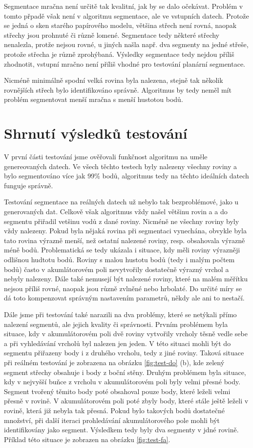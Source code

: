 \documentclass[11pt,twoside,a4paper]{book}
\begin{document}
Segmentace mračna není určitě tak kvalitní, jak by se dalo očekávat. Problém v tomto přpadě však není v algoritmu segmentace, ale ve vstupních datech. Protože se jedná o sken starého papírového modelu, většina střech není rovná, naopak střechy jsou prohnuté či různě lomené. Segmentace tedy některé střechy nenalezla, protže nejsou rovné, u jiných našla např. dva segmenty na jedné střeše, protože střecha je různě zprohýbaná. Výsledky segmentace tedy nejdou příliš zhodnotit, vstupní mračno není příliš vhodné pro testování planární segmentace.

Nicméně minimálně spodní velká rovina byla nalezena, stejně tak několik rovnějších střech bylo identifikováno správně. Algoritmus by tedy neměl mít problém segmentovat menší mračna s menší hustotou bodů.


\section{Shrnutí výsledků testování}

V první části testování jsme ověřovali funkčnost algoritmu na uměle genereovaných datech. Ve všech těchto testech byly nalezeny všechny roviny a bylo segmentováno více jak 99\% bodů, algoritmus tedy na těchto ideálních datech funguje správně.

Testování segmentace na reálných datech už nebylo tak bezproblémové, jako u generovaných dat. Celkově však algoritmus vždy našel většinu rovin a a do segmentu přiřadil vetšinu vodů z dané roviny. Nicméně ne všechny roviny byly vždy nalezeny. Pokud byla nějaká rovina při segmentaci vynechána, obvykle byla tato rovina výrazně menší, než ostatní nalezené roviny, resp. obsahovala výrazně méně bodů. Problematická se tedy ukázala i situace, kdy měli roviny výrazněji odlišnou hudtotu bodů. Roviny s malou hustotu bodů (tedy i malým počtem bodů) často v akumlátorovém poli nevytvořily dostatečně výrazný vrchol a nebyly nalezeny. Dále také nemusejí být nalezené roviny, které na malém měřítku nejsou příliš rovné, naopak jsou různě zvlněné nebo hrbolaté. Do určité míry se dá toto kompenzovat správným nastavením parametrů, někdy ale ani to nestačí. 

Dále jsme při testování také narazili na dva problémy, které se netýkali přímo nalezení segmentů, ale jejich kvality či správnosti. Prvním problémem byla situace, kdy v akumulátorovém poli dvě roviny vytvořily vrcholy těsně vedle sebe a při vyhledávání vrcholů byl nalezen jen jeden. V této situaci mohli být do segmentu přiřazeny body i z druhého vrcholu, tedy z jiné roviny. Taková situace při reálném testování je zobrazena na obrázku \ref{fig:test-do} (b), kde zelený segment střechy obsahuje i body z boční stěny. Druhým problémem byla situace, kdy v nejvyšší buňce z vrcholu v akumulátorovém poli byly velmi přesné body. Segment tvořený těmito body poté obsahoval pouze body, které leželi velmi přesně v rovině. V akumulátorovém poli poté zbyly body, které stále ještě leželi v rovině, která již nebyla tak přesná. Pokud bylo takových bodů dostatečné množství, při další iteraci prohledávání akumulátorového pole mohli být identifikovány jako segment. Výsledkem tedy byly dva segmenty v jdné rovině. Příklad této situace je zobrazen na obrázku \ref{fig:test-fa}.
\end{document}

